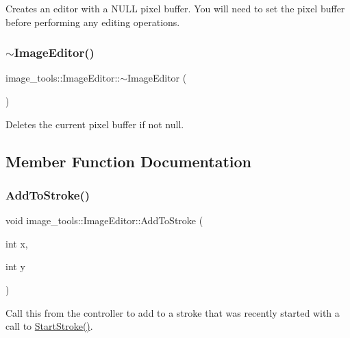 Creates an editor with a N\+U\+LL pixel buffer. You will need to set the pixel buffer before performing any editing operations. \mbox{\label{classimage__tools_1_1ImageEditor_ad3a824c648aee5889643207960d600d5}} 
\subsubsection{\texorpdfstring{$\sim$\+Image\+Editor()}{~ImageEditor()}}
{\footnotesize\ttfamily image\+\_\+tools\+::\+Image\+Editor\+::$\sim$\+Image\+Editor (\begin{DoxyParamCaption}{ }\end{DoxyParamCaption})\hspace{0.3cm}{\ttfamily [virtual]}}

Deletes the current pixel buffer if not null. 

\subsection{Member Function Documentation}
\mbox{\label{classimage__tools_1_1ImageEditor_ab3e3fdaa5a72bfb4a8004bd151c97921}} 
\subsubsection{\texorpdfstring{Add\+To\+Stroke()}{AddToStroke()}}
{\footnotesize\ttfamily void image\+\_\+tools\+::\+Image\+Editor\+::\+Add\+To\+Stroke (\begin{DoxyParamCaption}\item[{int}]{x,  }\item[{int}]{y }\end{DoxyParamCaption})}

Call this from the controller to add to a stroke that was recently started with a call to \hyperlink{classimage__tools_1_1ImageEditor_a396d6b86c6d740714f4311737a40e19c}{Start\+Stroke()}. \mbox{\label{classimage__tools_1_1ImageEditor_a4d610808946e2125d0ac1a702ec88f77}} 
